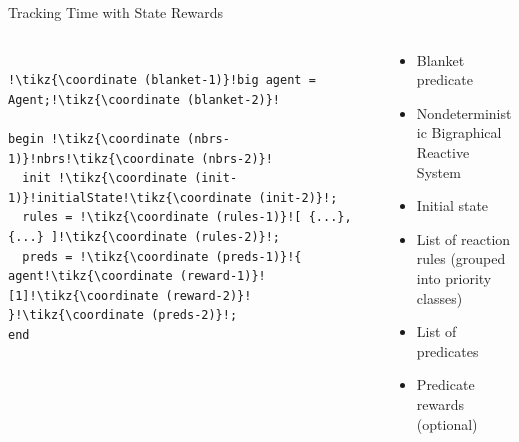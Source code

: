 \documentclass{beamer}
\begin{document}
\begin{frame}[fragile]{Tracking Time with State Rewards}
  \begin{columns}
    \begin{column}{0.5\textwidth}
\begin{lstlisting}[escapechar=!]

!\tikz{\coordinate (blanket-1)}!big agent = Agent;!\tikz{\coordinate (blanket-2)}!

begin !\tikz{\coordinate (nbrs-1)}!nbrs!\tikz{\coordinate (nbrs-2)}!
  init !\tikz{\coordinate (init-1)}!initialState!\tikz{\coordinate (init-2)}!;
  rules = !\tikz{\coordinate (rules-1)}![ {...}, {...} ]!\tikz{\coordinate (rules-2)}!;
  preds = !\tikz{\coordinate (preds-1)}!{ agent!\tikz{\coordinate (reward-1)}![1]!\tikz{\coordinate (reward-2)}! }!\tikz{\coordinate (preds-2)}!;
end

\end{lstlisting}
    \end{column}
    \begin{column}{0.5\textwidth}
      \begin{itemize}
      \item<2-> Blanket predicate
      \item<3-> Nondeterministic Bigraphical Reactive System
      \item<4-> Initial state
      \item<5-> List of reaction rules (grouped into priority classes)
      \item<6-> List of predicates
      \item<7-> Predicate rewards (optional)
      \end{itemize}
    \end{column}
  \end{columns}
\end{frame}
\end{document}

